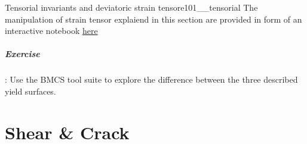 \documentclass[main.tex]{subfiles}
\begin{document}
\begin{bmcsex}{Tensorial invariants and deviatoric strain tensor}{e101__tensorial}
The manipulation of strain tensor explaiend in this section are provided in form of
an interactive notebook \href{https://wiki.imb.rwth-aachen.de/do/view/IMB/Teaching/TeachExampleObj0021}{here}
\end{bmcsex}

\paragraph{Exercise}: Use the BMCS tool suite to explore the difference between the three described yield surfaces.


\chapter{Shear \& Crack}
\end{document}
